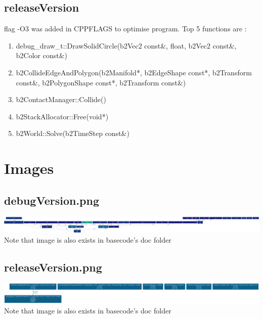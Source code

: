 \documentclass{article}
\begin{document}
\subsection{releaseVersion}
flag -O3 was added in CPPFLAGS to optimise program.
\newline
Top 5 functions are :
\begin{enumerate}
	\item debug\_draw\_t::DrawSolidCircle(b2Vec2 const\&, float, b2Vec2 const\&, b2Color const\&)
	\item b2CollideEdgeAndPolygon(b2Manifold*, b2EdgeShape const*, b2Transform const\&, b2PolygonShape const*, b2Transform const\&)
	\item b2ContactManager::Collide()
	\item b2StackAllocator::Free(void*)
	\item b2World::Solve(b2TimeStep const\&)
\end{enumerate}

\newpage
\section{Images}
\subsection{debugVersion.png}
\includegraphics[width=\linewidth]{debugVersion.png}
Note that image is also exists in basecode's doc folder


\subsection{releaseVersion.png}
\includegraphics[width=\linewidth]{releaseVersion.png}
Note that image is also exists in basecode's doc folder
\end{document}
